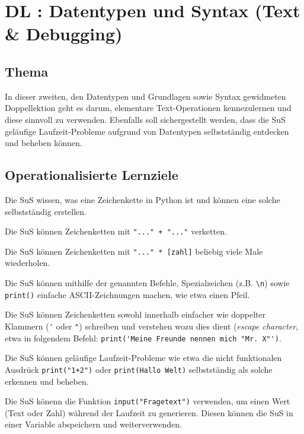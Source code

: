 \section{DL \themycounter: Datentypen und Syntax (Text \& Debugging)}
\begin{myExBox}[title=DL \themycounter]
\subsection*{Thema}
In dieser zweiten, den Datentypen und Grundlagen sowie Syntax gewidmeten Doppellektion geht es darum, elementare Text-Operationen kennezulernen und diese sinnvoll zu verwenden. Ebenfalls soll sichergestellt werden, dass die SuS geläufige Laufzeit-Probleme aufgrund von Datentypen selbstständig entdecken und beheben können.


\subsection*{Operationalisierte Lernziele}
\begin{todolist}
    \item Die SuS wissen, was eine Zeichenkette in Python ist und können eine solche selbstständig erstellen.
    \item Die SuS können Zeichenketten mit \lstinline|"..." + "..."| verketten.
    \item Die SuS können Zeichenketten mit \lstinline|"..." * [zahl]| beliebig viele Male wiederholen.
    \item Die SuS können mithilfe der genannten Befehle, Spezialzeichen (z.B. \lstinline|\n|) sowie \lstinline|print()| einfache ASCII-Zeichnungen machen, wie etwa einen Pfeil.
    \item Die SuS können Zeichenketten sowohl innerhalb einfacher wie doppelter Klammern (\lstinline|'| oder \lstinline|"|) schreiben und verstehen wozu dies dient (\textit{escape character}, etwa in folgendem Befehl: \lstinline|print('Meine Freunde nennen mich "Mr. X"')|.
    \item Die SuS können geläufige Laufzeit-Probleme wie etwa die nicht funktionalen Ausdrück \lstinline|print("1+2")| oder \lstinline|print(Hallo Welt)| selbstständig als solche erkennen und beheben.
    \item Die SuS könenn die Funktion \lstinline|input("Fragetext")| verwenden, um einen Wert (Text oder Zahl) während der Laufzeit zu generieren. Diesen können die SuS in einer Variable abspeichern und weiterverwenden.
\end{todolist}


\end{myExBox}
